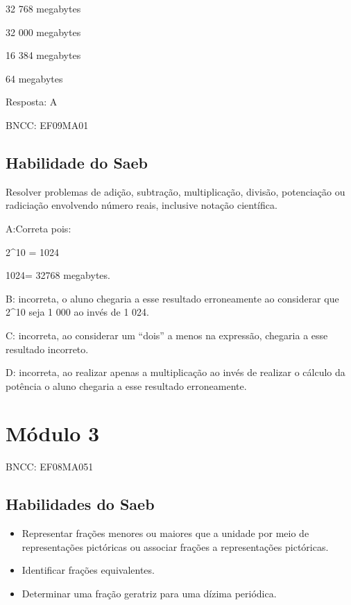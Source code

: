 \item 32 768 megabytes
\item 32 000 megabytes
\item 16 384 megabytes
\item 64 megabytes

Resposta: A

BNCC: EF09MA01

\section{Habilidade do Saeb}

Resolver problemas de adição, subtração, multiplicação, divisão,
potenciação ou radiciação envolvendo número reais, inclusive notação
científica.

A:Correta pois:

2^10 = 1024

1024= 32768 megabytes.

B: incorreta, o aluno chegaria a esse resultado erroneamente ao
considerar que 2^10 seja 1 000 ao invés de 1 024.

C: incorreta, ao considerar um ``dois'' a menos na expressão, chegaria a
esse resultado incorreto.

D: incorreta, ao realizar apenas a multiplicação ao invés de realizar o
cálculo da potência o aluno chegaria a esse resultado erroneamente.

\chapter{Módulo 3}

BNCC: EF08MA051

\section{Habilidades do Saeb}

\begin{itemize}

\item 
  Representar frações menores ou maiores que a unidade por meio de
  representações pictóricas ou associar frações a representações
  pictóricas.

\item 
  Identificar frações equivalentes.

\item 
  Determinar uma fração geratriz para uma dízima periódica.
\end{itemize}

